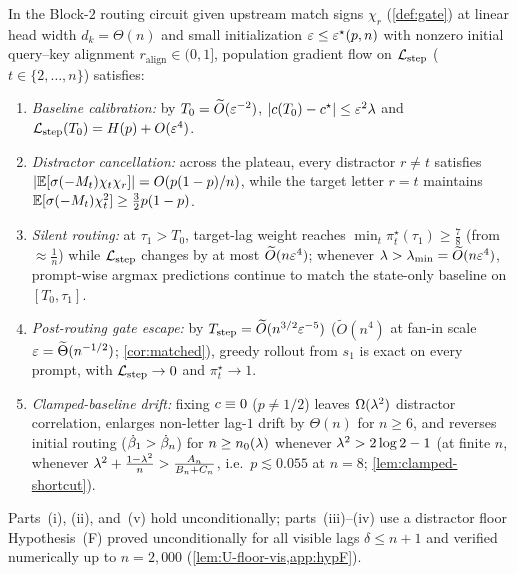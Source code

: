 \begin{theorem}
\label{thm:joint}
\label{thm:routing}
\label{cor:aligned}
\label{cor:free-running}
\label{thm:adaptive}
In the Block-$2$ routing circuit given upstream match signs $\chi_r$ (\cref{def:gate}) at linear head width $d_k = \Theta(n)$ and small initialization $\varepsilon \le \varepsilon^\star(p, n)$ with nonzero initial query--key alignment $r_{\mathrm{align}} \in (0,1]$, population gradient flow on $\mathcal L_{\mathrm{step}}$ ($t \in \{2,\ldots,n\}$) satisfies:
\begin{enumerate}[label=(\roman*),leftmargin=*,itemsep=1.2pt,topsep=2pt]
\item \emph{Baseline calibration:} by $T_0 = \widetilde O(\varepsilon^{-2})$, $|c(T_0) - c^\star| \le \varepsilon^2\lambda$ and $\mathcal L_{\mathrm{step}}(T_0) = H(p) + O(\varepsilon^4)$.
\item \emph{Distractor cancellation:} across the plateau, every distractor $r \ne t$ satisfies $|\mathbb E[\sigma(-M_t)\chi_t\chi_r]| = O(p(1-p)/n)$, while the target letter $r = t$ maintains $\mathbb E[\sigma(-M_t)\chi_t^2] \ge \frac{3}{2}p(1-p)$.
\item \emph{Silent routing:} at $\tau_1 > T_0$, target-lag weight reaches $\min_t \pi_t^\star(\tau_1) \ge \frac{7}{8}$ (from $\approx \frac{1}{n}$) while $\mathcal L_{\mathrm{step}}$ changes by at most $\widetilde O(n\varepsilon^4)$; whenever $\lambda > \lambda_{\min} = \widetilde O(n\varepsilon^4)$, prompt-wise argmax predictions continue to match the state-only baseline on $[T_0, \tau_1]$.
\item \emph{Post-routing gate escape:} by $T_{\mathrm{step}} = \widetilde O(n^{3/2}\varepsilon^{-5})$ ($\widetilde O(n^4)$ at fan-in scale $\varepsilon = \widetilde\Theta(n^{-1/2})$; \cref{cor:matched}), greedy rollout from $s_1$ is exact on every prompt, with $\mathcal L_{\mathrm{step}} \to 0$ and $\pi_t^\star \to 1$.
\item \emph{Clamped-baseline drift:} fixing $c \equiv 0$ ($p \ne 1/2$) leaves $\Omega(\lambda^2)$ distractor correlation, enlarges non-letter lag-$1$ drift by $\Theta(n)$ for $n \ge 6$, and reverses initial routing ($\dot{\beta}_1 > \dot{\beta}_n$) for $n \ge n_0(\lambda)$ whenever $\lambda^2 > 2\log 2 - 1$ (at finite $n$, whenever $\lambda^2 + \frac{1-\lambda^2}{n} > \frac{A_n}{B_n+C_n}$, i.e.\ $p \lesssim 0.055$ at $n = 8$; \cref{lem:clamped-shortcut}).
\end{enumerate}
Parts~(i), (ii), and~(v) hold unconditionally; parts~(iii)--(iv) use a distractor floor Hypothesis~(F) proved unconditionally for all visible lags $\delta \le n+1$ and verified numerically up to $n = 2{,}000$ (\cref{lem:U-floor-vis,app:hypF}).
\end{theorem}

